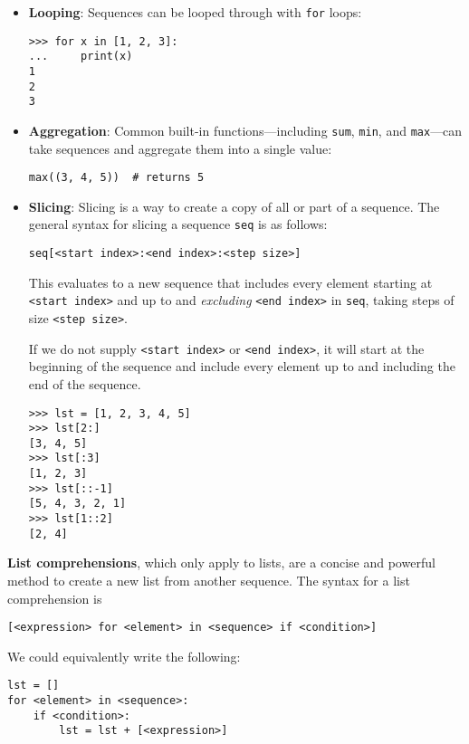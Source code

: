 \begin{itemize}
	\item \textbf{Looping}: Sequences can be looped through with \lstinline{for} loops:
	\vspace{-0.5em} %
	\begin{lstlisting}
>>> for x in [1, 2, 3]:
...     print(x)
1
2
3
	\end{lstlisting}

	\item \textbf{Aggregation}: Common built-in functions---including \lstinline{sum}, \lstinline{min}, and \lstinline{max}---can take sequences and aggregate them into a single value:
	\begin{lstlisting}
max((3, 4, 5))  # returns 5
	\end{lstlisting}

	\item \textbf{Slicing}: Slicing is a way to create a copy of all or part of a sequence. The general syntax for slicing a sequence \lstinline{seq} is as follows:
	\begin{lstlisting}
seq[<start index>:<end index>:<step size>]
	\end{lstlisting}

This evaluates to a new sequence that includes every element starting at \lstinline{<start index>} and up to and \textit{excluding} \lstinline{<end index>} in \lstinline{seq}, taking steps of size \lstinline{<step size>}. 

If we do not supply \lstinline{<start index>} or \lstinline{<end index>}, it will start at the beginning of the sequence and include every element up to and including the end of the sequence. 

\begin{lstlisting}
>>> lst = [1, 2, 3, 4, 5]
>>> lst[2:] 
[3, 4, 5]
>>> lst[:3] 
[1, 2, 3]
>>> lst[::-1] 
[5, 4, 3, 2, 1]
>>> lst[1::2] 
[2, 4]
\end{lstlisting}

\end{itemize}
\vspace{0.3 in}
\textbf{List comprehensions}, which only apply to lists, are a concise and powerful method to create a new list from another sequence. The syntax for a list comprehension is
   \begin{lstlisting}
[<expression> for <element> in <sequence> if <condition>]
   \end{lstlisting}

\begin{blocksection}
We could equivalently write the following: 
\begin{lstlisting}
lst = []
for <element> in <sequence>:
    if <condition>:
        lst = lst + [<expression>] 
\end{lstlisting}
\end{blocksection}

